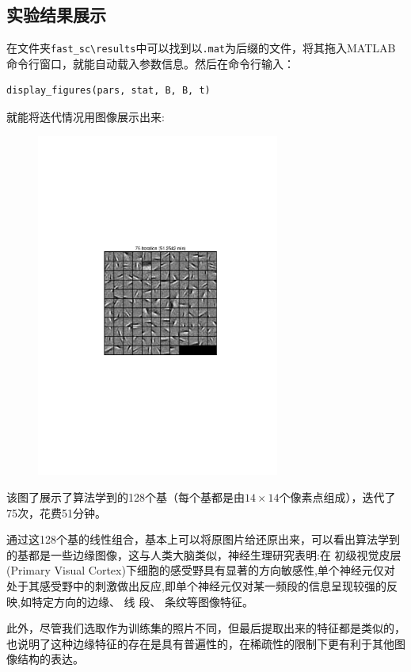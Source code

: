 \subsection*{实验结果展示}
在文件夹\verb"fast_sc\results"中可以找到以\verb".mat"为后缀的文件，将其拖入MATLAB命令行窗口，就能自动载入参数信息。然后在命令行输入：
\begin{verbatim}
display_figures(pars, stat, B, B, t)
\end{verbatim}
就能将迭代情况用图像展示出来:

\begin{figure}[H]
\centering
\includegraphics[width=8cm]{fig/128_12.pdf}
\label{fig1}
\end{figure}
该图了展示了算法学到的128个基（每个基都是由$14\times14$个像素点组成），迭代了75次，花费51分钟。

通过这128个基的线性组合，基本上可以将原图片给还原出来，可以看出算法学到的基都是一些边缘图像，这与人类大脑类似，神经生理研究表明:在
初级视觉皮层(Primary Visual Cortex)下细胞的感受野具有显著的方向敏感性,单个神经元仅对处于其感受野中的刺激做出反应,即单个神经元仅对某一频段的信息呈现较强的反映,如特定方向的边缘、 线
段、 条纹等图像特征。

此外，尽管我们选取作为训练集的照片不同，但最后提取出来的特征都是类似的，也说明了这种边缘特征的存在是具有普遍性的，在稀疏性的限制下更有利于其他图像结构的表达。

